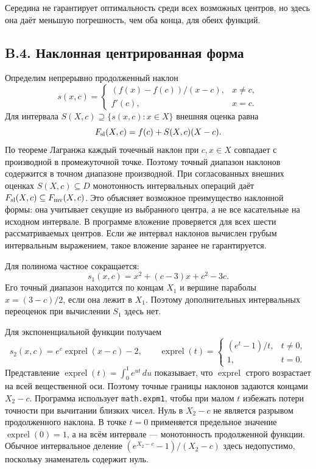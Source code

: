 \documentclass[12pt,a4paper]{article}
\newcommand{\exprel}{\operatorname{exprel}}
\begin{document}
Середина не гарантирует оптимальность среди всех возможных центров,
но здесь она даёт меньшую погрешность, чем оба конца, для обеих функций.

\subsection*{B.4. Наклонная центрированная форма}
Определим непрерывно продолженный наклон
\[
s(x,c)=\begin{cases}(f(x)-f(c))/(x-c),&x\ne c,\\f'(c),&x=c.\end{cases}
\]
Для интервала $S(X,c)\supseteq\{s(x,c):x\in X\}$ внешняя оценка равна
\begin{equation}\label{eq:sl}
F_{\rm sl}(X,c)=f(c)+S(X,c)(X-c).
\end{equation}
По теореме Лагранжа каждый точечный наклон при $c,x\in X$
совпадает с производной в промежуточной точке. Поэтому точный
диапазон наклонов содержится в точном диапазоне производной.
При согласованных внешних оценках $S(X,c)\subseteq D$
монотонность интервальных операций даёт
$F_{\rm sl}(X,c)\subseteq F_{\rm mv}(X,c)$.
Это объясняет возможное преимущество наклонной формы:
она учитывает секущие из выбранного центра, а не все касательные
на исходном интервале. В программе вложение проверяется для всех
шести рассматриваемых центров. Если же интервал наклонов вычислен
грубым интервальным выражением, такое вложение заранее не гарантируется.

Для полинома частное сокращается:
\[
s_1(x,c)=x^2+(c-3)x+c^2-3c.
\]
Его точный диапазон находится по концам $X_1$ и вершине параболы
$x=(3-c)/2$, если она лежит в $X_1$. Поэтому дополнительных
интервальных переоценок при вычислении $S_1$ здесь нет.

Для экспоненциальной функции получаем
\begin{equation}\label{eq:exprel}
s_2(x,c)=e^c\exprel(x-c)-2,\qquad
\exprel(t)=\begin{cases}(e^t-1)/t,&t\ne0,\\1,&t=0.\end{cases}
\end{equation}
Представление $\exprel(t)=\int_0^1e^{ut}\,du$ показывает, что
$\exprel$ строго возрастает на всей вещественной оси. Поэтому точные
границы наклонов задаются концами $X_2-c$.
Программа использует \texttt{math.expm1}, чтобы при малом $t$ избежать
потери точности при вычитании близких чисел.
Нуль в $X_2-c$ не является разрывом продолженного наклона.
В точке $t=0$ применяется предельное значение $\exprel(0)=1$,
а на всём интервале --- монотонность продолженной функции.
Обычное интервальное деление $(e^{X_2-c}-1)/(X_2-c)$ здесь
недопустимо, поскольку знаменатель содержит нуль.
\end{document}

